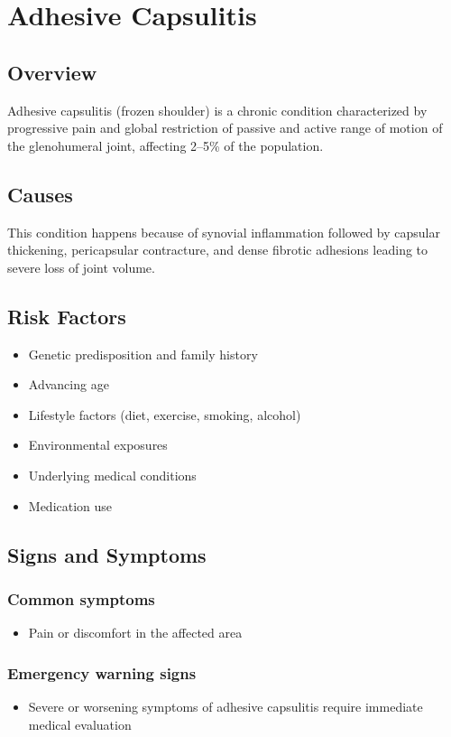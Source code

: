 \chapter{Adhesive Capsulitis}
\label{sec:Adhesive Capsulitis}

\section{Overview}
Adhesive capsulitis (frozen shoulder) is a chronic condition characterized by progressive pain and global restriction of passive and active range of motion of the glenohumeral joint, affecting 2--5\% of the population.
\section{Causes}
This condition happens because of synovial inflammation followed by capsular thickening, pericapsular contracture, and dense fibrotic adhesions leading to severe loss of joint volume.     
\section{Risk Factors}

\begin{itemize}[noitemsep]
  \item Genetic predisposition and family history
  \item Advancing age
  \item Lifestyle factors (diet, exercise, smoking, alcohol)
  \item Environmental exposures
  \item Underlying medical conditions
  \item Medication use
\end{itemize}
\section{Signs and Symptoms}

\subsection{Common symptoms}
\begin{itemize}[noitemsep]
  \item Pain or discomfort in the affected area
  \end{itemize}

\subsection{Emergency warning signs}
\begin{itemize}[noitemsep]
  \item Severe or worsening symptoms of adhesive capsulitis require immediate medical evaluation
\end{itemize}
